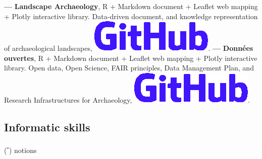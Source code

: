 \documentclass{article}
\begin{document}
\smallbreak
\textbf{--- }\textbf{Landscape Archaeology}, \textsf{R} + \textsf{Markdown} document + \textsf{Leaflet} web mapping + \textsf{Plotly} interactive library. Data-driven document, and knowledge representation of archaeological landscapes, \href{https://zoometh.github.io/popland}{\includegraphics[scale=0.1]{github-rect.png}}.
\smallbreak
\textbf{--- }\textbf{Donn\'{e}es ouvertes}, \textsf{R} + \textsf{Markdown} document + \textsf{Leaflet} web mapping + \textsf{Plotly} interactive library. Open data, Open Science, FAIR principles, Data Management Plan, and Research Infrastructures for Archaeology, \href{https://zoometh.github.io/LOD}{\includegraphics[scale=0.1]{github-rect.png}}.

\subsection*{Informatic skills}
\begin{center}(\textbf{\textsuperscript{-}}) notions \end{center}
\smallbreak
\end{document}
